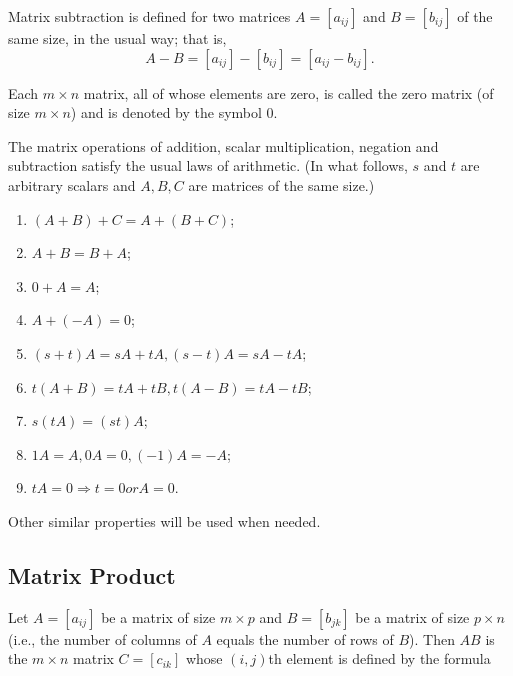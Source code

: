 \documentclass[../main.tex]{subfiles}
\begin{document}
\begin{definition}
	\label{defn:defn_1_5}
	Matrix subtraction is defined for two matrices $A = [a_{ij}]$ and $B = [b_{ij}]$ of the same size, in the usual way; that is,
	$$A - B = [a_{ij}] - [b_{ij}] = [a_{ij} - b_{ij}]. $$
\end{definition}

\begin{definition}
	\label{defn:defn_1_6}
	Each $m \times n$ matrix, all of whose elements are zero, is called the zero matrix (of size $m \times n$) and is denoted by the symbol $0$.
\end{definition}


The matrix operations of addition, scalar multiplication, negation and subtraction satisfy the usual laws of arithmetic. (In what follows, $s$ and $t$ are arbitrary scalars and $A, B, C$ are matrices of the same size.)

\begin{enumerate}[label = \textbf{\arabic*. }, noitemsep]
	\item  $(A + B) + C = A + (B + C)$;
	\item  $ A + B = B + A$;
	\item  $0 + A = A$;
	\item  $A + (-A) = 0$;
	\item  $(s + t)A = sA + tA, (s - t)A = sA - tA$;
	\item  $t(A + B) = tA + tB, t(A - B) = tA - tB$;
	\item  $s(tA) = (st)A$;
	\item  $1A = A, 0A = 0, (-1)A = -A$;
	\item  $tA = 0 \Rightarrow t = 0 or A = 0$.
\end{enumerate}

\noindent Other similar properties will be used when needed.

\subsection{Matrix Product}
\label{sec:sec_1_1_1}

\begin{definition}
	\label{defn:defn_1_7}
	Let $A = [a_{ij}]$ be a matrix of size $m \times p$ and $B = [b_{jk}]$ be a matrix of size $p \times n$ (i.e., the number of columns of $A$ equals the number of rows of $B$). Then $AB$ is the $m \times n$ matrix $C = [c_{ik}]$ whose $(i, j)$th element is defined by the formula
\end{definition}
\end{document}
